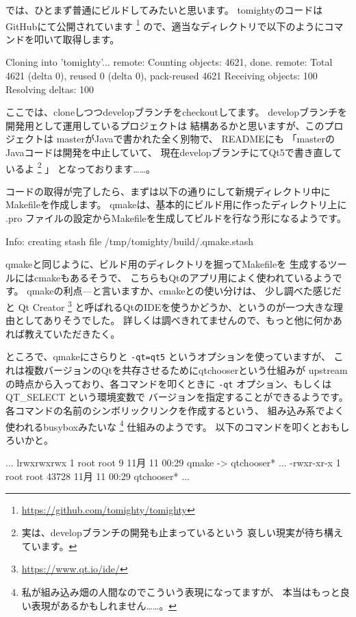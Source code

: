 \documentclass[mingoth,a4paper]{jsarticle}
\begin{document}
では、ひとまず普通にビルドしてみたいと思います。
tomightyのコードはGitHubにて公開されています
\footnote{\url{https://github.com/tomighty/tomighty}}
ので、適当なディレクトリで以下のようにコマンドを叩いて取得します。
\begin{commandline}
 Cloning into 'tomighty'...
 remote: Counting objects: 4621, done.
 remote: Total 4621 (delta 0), reused 0 (delta 0), pack-reused 4621
 Receiving objects: 100%
 Resolving deltas: 100%
\end{commandline}
ここでは、cloneしつつdevelopブランチをcheckoutしてます。
developブランチを開発用として運用しているプロジェクトは
結構あるかと思いますが、このプロジェクトは
masterがJavaで書かれた全く別物で、
READMEにも
「masterのJavaコードは開発を中止していて、
現在developブランチにてQt5で書き直しているよ
\footnote{実は、developブランチの開発も止まっているという
哀しい現実が待ち構えています。}
」
となっております……。

コードの取得が完了したら、まずは以下の通りにして新規ディレクトリ中に
Makefileを作成します。
qmakeは、基本的にビルド用に作ったディレクトリ上に
.pro ファイルの設定からMakefileを生成してビルドを行なう形になるようです。
\begin{commandline}
 Info: creating stash file /tmp/tomighty/build/.qmake.stash
\end{commandline}
qmakeと同じように、ビルド用のディレクトリを掘ってMakefileを
生成するツールにはcmakeもあるそうで、
こちらもQtのアプリ用によく使われているようです。
qmakeの利点---と言いますか、cmakeとの使い分けは、
少し調べた感じだと Qt Creator
\footnote{\url{https://www.qt.io/ide/}}
と呼ばれるQtのIDEを使うかどうか、というのが一つ大きな理由としてありそうでした。
詳しくは調べきれてませんので、もっと他に何かあれば教えていただきたく。

ところで、qmakeにさらりと \verb|-qt=qt5| というオプションを使っていますが、
これは複数バージョンのQtを共存させるためにqtchooserという仕組みが
upstreamの時点から入っており、各コマンドを叩くときに
\verb|-qt| オプション、もしくは QT\_SELECT という環境変数で
バージョンを指定することができるようです。
各コマンドの名前のシンボリックリンクを作成するという、
組み込み系でよく使われるbusyboxみたいな
\footnote{私が組み込み畑の人間なのでこういう表現になってますが、
本当はもっと良い表現があるかもしれません……。}
仕組みのようです。
以下のコマンドを叩くとおもしろいかと。
 \begin{commandline}
  ...
lrwxrwxrwx 1 root   root           9 11月 11 00:29 qmake -> qtchooser*
  ...
-rwxr-xr-x 1 root   root       43728 11月 11 00:29 qtchooser*
  ...
 \end{commandline}
\end{document}
